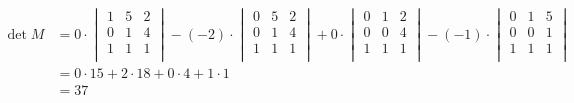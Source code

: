 \documentclass[a4paper,10pt,DIV=14]{article}
\begin{document}
\begin{align*}
	\det M & = 0 \cdot	\begin{vmatrix}
							1 & 5 & 2 \\
							0 & 1 & 4 \\
							1 & 1 & 1 \\
						\end{vmatrix}
		 - (-2) \cdot	\begin{vmatrix}
						 	0 & 5 & 2 \\
						 	0 & 1 & 4 \\
						 	1 & 1 & 1 \\
						\end{vmatrix}
		 + 0 \cdot		\begin{vmatrix}
						 	0 & 1 & 2 \\
						 	0 & 0 & 4 \\
						 	1 & 1 & 1 \\
						\end{vmatrix}
		 - (-1) \cdot	\begin{vmatrix}
		 					0 & 1 & 5 \\
		 					0 & 0 & 1 \\
		 					1 & 1 & 1 \\
						\end{vmatrix} \\
	       & = 0 \cdot 15 + 2 \cdot 18 + 0 \cdot 4 + 1 \cdot 1 \\
	       & = 37
\end{align*}
\end{document}
